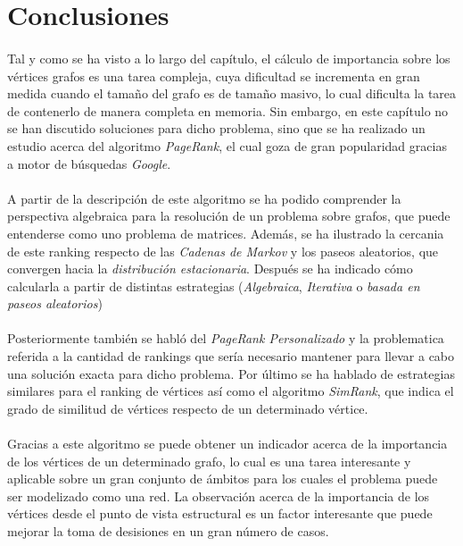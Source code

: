 \documentclass{subfiles}
\begin{document}
    \section{Conclusiones}
    \label{sec:pagerank_conclusions}

      \paragraph{}
      Tal y como se ha visto a lo largo del capítulo, el cálculo de importancia sobre los vértices grafos es una tarea compleja, cuya dificultad se incrementa en gran medida cuando el tamaño del grafo es de tamaño masivo, lo cual dificulta la tarea de contenerlo de manera completa en memoria. Sin embargo, en este capítulo no se han discutido soluciones para dicho problema, sino que se ha realizado un estudio acerca del algoritmo \emph{PageRank}, el cual goza de gran popularidad gracias a motor de búsquedas \emph{Google}.

      \paragraph{}
      A partir de la descripción de este algoritmo se ha podido comprender la perspectiva algebraica para la resolución de un problema sobre grafos, que puede entenderse como uno problema de matrices. Además, se ha ilustrado la cercania de este ranking respecto de las \emph{Cadenas de Markov} y los paseos aleatorios, que convergen hacia la \emph{distribución estacionaria}. Después se ha indicado cómo calcularla a partir de distintas estrategias (\emph{Algebraica}, \emph{Iterativa} o \emph{basada en paseos aleatorios})

      \paragraph{}
      Posteriormente también se habló del \emph{PageRank Personalizado} y la problematica referida a la cantidad de rankings que sería necesario mantener para llevar a cabo una solución exacta para dicho problema. Por último se ha hablado de estrategias similares para el ranking de vértices así como el algoritmo \emph{SimRank}, que indica el grado de similitud de vértices respecto de un determinado vértice.

      \paragraph{}
      Gracias a este algoritmo se puede obtener un indicador acerca de la importancia de los vértices de un determinado grafo, lo cual es una tarea interesante y aplicable sobre un gran conjunto de ámbitos para los cuales el problema puede ser modelizado como una red. La observación acerca de la importancia de los vértices desde el punto de vista estructural es un factor interesante que puede mejorar la toma de desisiones en un gran número de casos.
\end{document}
